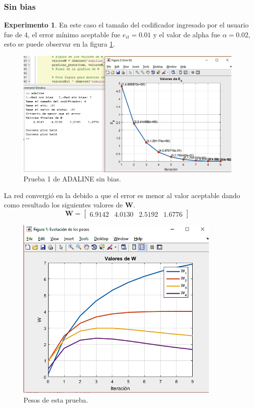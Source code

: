 \subsubsection{Sin bias}
\textbf{Experimento 1}. En este caso el tamaño del codificador ingresado por el usuario fue de 4, el error mínimo aceptable fue $e_{it} = 0.01$ y el valor de alpha fue $\alpha=0.02$, esto se puede observar en la figura \ref{fig:adaline3error}.
\begin{figure}[H]
    \begin{center}
        \includegraphics[width=16cm]{img/adaline3/error.png}
        \caption{Prueba 1 de ADALINE sin bias.}
        \label{fig:adaline3error}
    \end{center}
\end{figure}
La red convergió en la debido a que el error es menor al valor aceptable dando como resultado los siguientes valores de $\boldsymbol{W}$.
\[ \boldsymbol{W} = \left[\begin{array}{cccc}6.9142 & 4.0130 & 2.5192 & 1.6776\end{array}\right] \]
\begin{figure}[H]
    \begin{center}
        \includegraphics[width=10cm]{img/adaline3/pesosbias.png}
        \caption{Pesos de esta prueba.}
        \label{fig:adaline3pesos}
    \end{center}
\end{figure}
